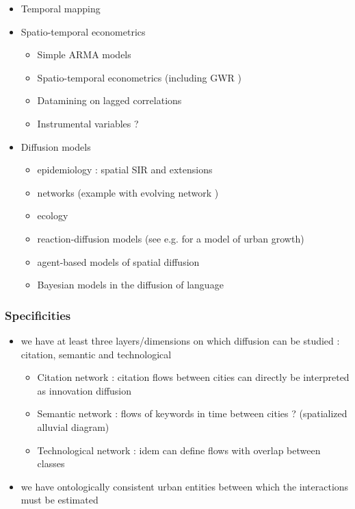 \begin{itemize}
	\item Temporal mapping \cite{hagerstrand1968innovation}
	\item Spatio-temporal econometrics
    \begin{itemize}
    	\item Simple ARMA models 
        \item Spatio-temporal econometrics (including GWR \cite{brunsdon1998geographically}) \cite{lichstein2002spatial}
        \item Datamining on lagged correlations \cite{raimbault2017identification}
        \item Instrumental variables ?
    \end{itemize}
	\item Diffusion models
    \begin{itemize}
    	\item epidemiology : spatial SIR and extensions \cite{keeling1999effects} \cite{fuentes1999cellular}
    	\item networks \cite{valente2005network} \cite{Zhang2018} (example with evolving network \cite{gross2006epidemic})
        \item ecology \cite{sonis1983spatio}
        \item reaction-diffusion models (see e.g. \cite{raimbault2018calibration} for a model of urban growth)
        \item agent-based models of spatial diffusion \cite{le2018aggregate}
        \item Bayesian models in the diffusion of language \cite{bouckaert2012mapping}
    \end{itemize}
    
\end{itemize}


\subsubsection{Specificities}

\begin{itemize}
    \item we have at least three layers/dimensions on which diffusion can be studied : citation, semantic and technological
    \begin{itemize}
    	\item Citation network : citation flows between cities can directly be interpreted as innovation diffusion
        \item Semantic network : flows of keywords in time between cities ? (spatialized alluvial diagram)
        \item Technological network : idem can define flows with overlap between classes
    \end{itemize}
	\item we have ontologically consistent urban entities between which the interactions must be estimated
\end{itemize}




